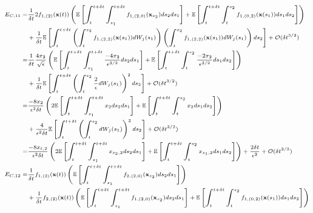 \begin{equation}
\scriptsize
\begin{aligned}
E_{C,11}
=&
\frac{1}{\delta t} 2 f_{1,(2)}(\mathbf{x}(t)) \left( \mathbb{E} \left[ \int_t^{t+\delta t} \int_{s_1}^{t+\delta t} f_{1,(2,0)}(\mathbf{x}_{s_2}) ds_2 ds_1 \right]
+ \mathbb{E} \left[  \int_t^{t+\delta t} \int_t^{s_2} f_{1,(0,2)}(\mathbf{x}(s_1)) ds_1 ds_2\right] \right) \\
&+ \frac{1}{\delta t}  \mathbb{E} \left[ \int_t^{t+\delta t}\left( \int_t^{s_2} f_{1,(2,2)}(\mathbf{x}(s_1)) dW_j(s_1)  \right) \left(  \int_t^{s_2} f_{1,(2,2)}(\mathbf{x}(s_1)) dW_j(s_1) \right) ds_2 \right]
+ \mathcal{O} (\delta t^{3/2}) \\
=&
\frac{1}{\delta t}  \frac{4 x_2}{\sqrt{\epsilon}} \left( \mathbb{E} \left[ \int_t^{t+\delta t} \int_{s_1}^{t+\delta t} \frac{-4 x_2}{\epsilon^{3/2}} ds_2 ds_1 \right]
+ \mathbb{E} \left[  \int_t^{t+\delta t} \int_t^{s_2} \frac{-2 x_2}{\epsilon^{3/2}} ds_1 ds_2\right] \right) \\
&+ \frac{1}{\delta t} \mathbb{E} \left[ \int_t^{t+\delta t}\left( \int_t^{s_2} \frac{2}{\epsilon} dW_j(s_1)  \right)^2 ds_2 \right]
+ \mathcal{O} (\delta t^{3/2}) \\
=&
\frac{-8 x_2}{\epsilon^2 \delta t} \left( 2 \mathbb{E} \left[ \int_t^{t+\delta t} \int_{s_1}^{t+\delta t} x_2 ds_2 ds_1 \right]
+ \mathbb{E} \left[  \int_t^{t+\delta t} \int_t^{s_2} x_2 ds_1 ds_2\right] \right) \\
&+ \frac{4}{\epsilon^2 \delta t} \mathbb{E} \left[ \int_t^{t+\delta t}\left( \int_t^{s_2} dW_j(s_1)  \right)^2 ds_2 \right]
+ \mathcal{O} (\delta t^{3/2}) \\
=&
\frac{-8 x_{t,2}}{\epsilon^2 \delta t} \left( 2 \mathbb{E} \left[ \int_t^{t+\delta t} \int_{s_1}^{t+\delta t} x_{s_2,2} ds_2 ds_1 \right]
+ \mathbb{E} \left[  \int_t^{t+\delta t} \int_t^{s_2} x_{s_1,2} ds_1 ds_2\right] \right)
+ \frac{2 \delta t}{\epsilon^2}
+ \mathcal{O} (\delta t^{3/2}) \\
%
E_{C, 12}
=&
\frac{1}{\delta t}  f_{1,(2)}(\mathbf{x}(t)) \left( \mathbb{E} \left[ \int_t^{t+\delta t} \int_{s_1}^{t+\delta t} f_{2,(2,0)}(\mathbf{x}_{s_2}) ds_2 ds_1 \right]  \right) \\
&+ \frac{1}{\delta t} f_{2,(2)}(\mathbf{x}(t)) \left( \mathbb{E} \left[ \int_t^{t+\delta t} \int_{s_1}^{t + \delta t} f_{1,(2,0)}(\mathbf{x}_{s_2}) ds_2 ds_1 \right]
+ \mathbb{E} \left[ \int_t^{t+\delta t} \int_t^{s_2} f_{1,(0,2)}(\mathbf{x}(s_1)) ds_1 ds_2 \right] \right) \\

\end{aligned}
\end{equation}
